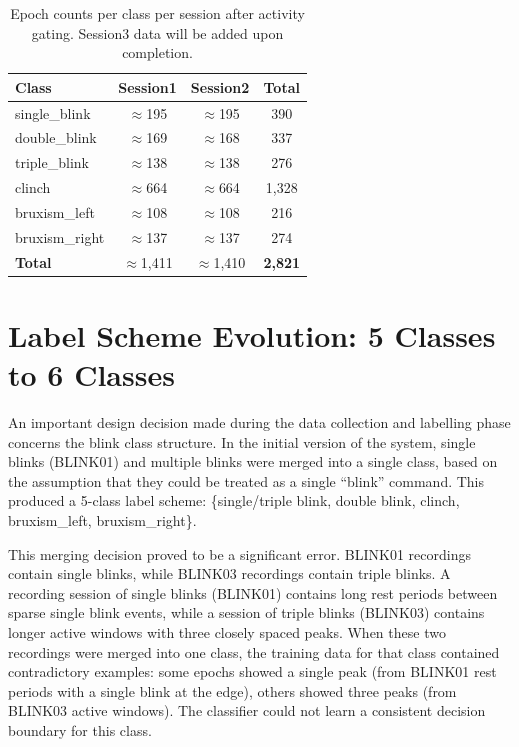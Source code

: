 \begin{table}[htbp]
\centering
\caption{Epoch counts per class per session after activity
gating. Session3 data will be added upon completion.}
\label{tab:session_stats}
\renewcommand{\arraystretch}{1.3}
\begin{tabular}{l c c c}
\toprule
\textbf{Class} & \textbf{Session1} & \textbf{Session2} &
\textbf{Total} \\
\midrule
single\_blink  & $\approx$195 & $\approx$195 & 390 \\
double\_blink  & $\approx$169 & $\approx$168 & 337 \\
triple\_blink  & $\approx$138 & $\approx$138 & 276 \\
clinch         & $\approx$664 & $\approx$664 & 1{,}328 \\
bruxism\_left  & $\approx$108 & $\approx$108 & 216 \\
bruxism\_right & $\approx$137 & $\approx$137 & 274 \\
\midrule
\textbf{Total} & $\approx$1{,}411 & $\approx$1{,}410 &
\textbf{2{,}821} \\
\bottomrule
\end{tabular}
\end{table}

\section{Label Scheme Evolution: 5 Classes to 6 Classes}
\label{sec:dc_labels}

An important design decision made during the data collection
and labelling phase concerns the blink class structure. In the
initial version of the system, single blinks (BLINK01) and
multiple blinks were merged into a single class, based on the
assumption that they could be treated as a single ``blink''
command. This produced a 5-class label scheme:
\{single/triple blink, double blink, clinch, bruxism\_left,
bruxism\_right\}.

This merging decision proved to be a significant error.
BLINK01 recordings contain single blinks, while BLINK03
recordings contain triple blinks. A recording session of single
blinks (BLINK01) contains long rest periods between sparse
single blink events, while a session of triple blinks (BLINK03)
contains longer active windows with three closely spaced peaks.
When these two recordings were merged into one class, the
training data for that class contained contradictory examples:
some epochs showed a single peak (from BLINK01 rest periods
with a single blink at the edge), others showed three peaks
(from BLINK03 active windows). The classifier could not learn
a consistent decision boundary for this class.

